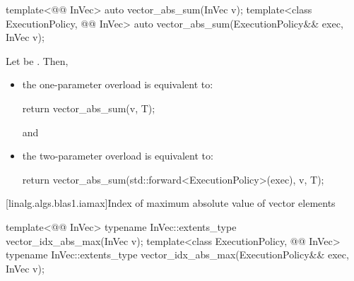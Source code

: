 %
\begin{itemdecl}
template<@@ InVec>
  auto vector_abs_sum(InVec v);
template<class ExecutionPolicy, @@ InVec>
  auto vector_abs_sum(ExecutionPolicy&& exec, InVec v);
\end{itemdecl}

\begin{itemdescr}
\pnum
\effects
Let  be .
Then,
\begin{itemize}
\item
the one-parameter overload is equivalent to:
\begin{codeblock}
return vector_abs_sum(v, T{});
\end{codeblock}
and
\item
the two-parameter overload is equivalent to:
\begin{codeblock}
return vector_abs_sum(std::forward<ExecutionPolicy>(exec), v, T{});
\end{codeblock}
\end{itemize}
\end{itemdescr}

[linalg.algs.blas1.iamax]{Index of maximum absolute value of vector elements}

%
\begin{itemdecl}
template<@@ InVec>
  typename InVec::extents_type vector_idx_abs_max(InVec v);
template<class ExecutionPolicy, @@ InVec>
  typename InVec::extents_type vector_idx_abs_max(ExecutionPolicy&& exec, InVec v);
\end{itemdecl}

